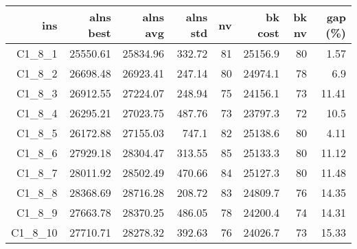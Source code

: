   \begin{table}[caption={Kết quả đo với tập HG\_C\_1\_8 800 yêu cầu}, label=exp:HGC18]
    \centering
    \begin{tabular}{rrrrrrrr}
    \hline
    ins & alns best & alns avg & alns std & nv & bk cost & bk nv & gap (\%) \\ \hline
    C1\_8\_1 & 25550.61 & 25834.96 & 332.72 & 81 & 25156.9 & 80 & 1.57 \\ \hline
    C1\_8\_2 & 26698.48 & 26923.41 & 247.14 & 80 & 24974.1 & 78 & 6.9 \\ \hline
    C1\_8\_3 & 26912.55 & 27224.07 & 248.94 & 75 & 24156.1 & 73 & 11.41 \\ \hline
    C1\_8\_4 & 26295.21 & 27023.75 & 487.76 & 73 & 23797.3 & 72 & 10.5 \\ \hline
    C1\_8\_5 & 26172.88 & 27155.03 & 747.1 & 82 & 25138.6 & 80 & 4.11 \\ \hline
    C1\_8\_6 & 27929.18 & 28304.47 & 313.55 & 85 & 25133.3 & 80 & 11.12 \\ \hline
    C1\_8\_7 & 28011.92 & 28502.49 & 470.66 & 84 & 25127.3 & 80 & 11.48 \\ \hline
    C1\_8\_8 & 28368.69 & 28716.28 & 208.72 & 83 & 24809.7 & 76 & 14.35 \\ \hline
    C1\_8\_9 & 27663.78 & 28370.25 & 486.05 & 78 & 24200.4 & 74 & 14.31 \\ \hline
    C1\_8\_10 & 27710.71 & 28278.32 & 392.63 & 76 & 24026.7 & 73 & 15.33 \\ \hline
    \end{tabular}
  \end{table}

